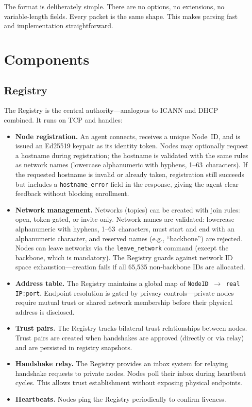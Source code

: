 \documentclass[11pt,a4paper]{article}
\begin{document}
The format is deliberately simple. There are no options, no extensions, no variable-length fields. Every packet is the same shape. This makes parsing fast and implementation straightforward.

\section{Components}

\subsection{Registry}

The Registry is the central authority---analogous to ICANN and DHCP combined. It runs on TCP and handles:

\begin{itemize}
    \item \textbf{Node registration.} An agent connects, receives a unique Node~ID, and is issued an Ed25519 keypair as its identity token. Nodes may optionally request a hostname during registration; the hostname is validated with the same rules as network names (lowercase alphanumeric with hyphens, 1--63~characters). If the requested hostname is invalid or already taken, registration still succeeds but includes a \texttt{hostname\_error} field in the response, giving the agent clear feedback without blocking enrollment.
    \item \textbf{Network management.} Networks (topics) can be created with join rules: open, token-gated, or invite-only. Network names are validated: lowercase alphanumeric with hyphens, 1--63~characters, must start and end with an alphanumeric character, and reserved names (e.g., ``backbone'') are rejected. Nodes can leave networks via the \texttt{leave\_network} command (except the backbone, which is mandatory). The Registry guards against network ID space exhaustion---creation fails if all 65{,}535 non-backbone IDs are allocated.
    \item \textbf{Address table.} The Registry maintains a global map of \mbox{\texttt{NodeID $\rightarrow$ real IP:port}}. Endpoint resolution is gated by privacy controls---private nodes require mutual trust or shared network membership before their physical address is disclosed.
    \item \textbf{Trust pairs.} The Registry tracks bilateral trust relationships between nodes. Trust pairs are created when handshakes are approved (directly or via relay) and are persisted in registry snapshots.
    \item \textbf{Handshake relay.} The Registry provides an inbox system for relaying handshake requests to private nodes. Nodes poll their inbox during heartbeat cycles. This allows trust establishment without exposing physical endpoints.
    \item \textbf{Heartbeats.} Nodes ping the Registry periodically to confirm liveness.
\end{itemize}
\end{document}
